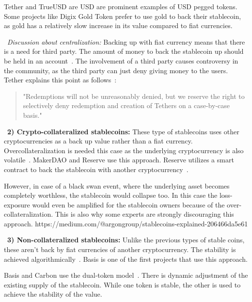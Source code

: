 Tether and TrueUSD are USD are prominent examples of USD pegged tokens. Some projects like Digix Gold Token prefer to use gold to back their stablecoin, as gold has a relatively slow increase in its value compared to fiat currencies. %

~\textit{Discussion about centralization:} Backing up with fiat currency means that there is a need for third party. The amount of money to back the stablecoin up should be held in an account~\cite{techrev}. The involvement of a third party causes controversy in the community, as the third party can just deny giving money to the users. Tether explains this point as follows~\cite{cryptoinsider}:

\begin{quote}
"Redemptions will not be unreasonably denied, but we reserve the right to selectively deny redemption and creation of Tethers on a case-by-case basis."
\end{quote}


~\textbf{2) Crypto-collateralized stablecoins:} These type of stablecoins uses other cryptocurrencies as a back up value rather than a fiat currency. Overcollateralization is needed this case as the underlying cryptocurrency is also volatile~\cite{linkedin}. MakerDAO and Reserve use this approach. Reserve utilizes a smart contract to back the stablecoin with another cryptocurrency~\cite{cointelegraph}.

However, in case of a black swan event, where the underlying asset becomes completely worthless, the stablecoin would collapse too. In this case the loss-exposure would even be amplified for the stablecoin owners because of the over-collateralization. This is also why some experts are strongly discouraging this approach.
https://medium.com/@argongroup/stablecoins-explained-206466da5e61

~\textbf{3) Non-collateralized stablecoins:} Unlike the previous types of stable coins, these aren't back by fiat currencies of another cryptocurrency. The stability is achieved algorithmically~\cite{linkedin}. Basis is one of the first projects that use this approach.

Basis and Carbon use the dual-token model~\cite{cryptoinsider}. There is dynamic adjustment of the existing supply of the stablecoin. While one token is stable, the other is used to achieve the stability of the value.


